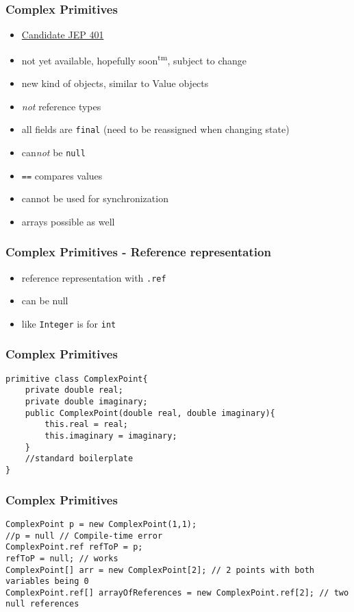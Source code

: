 \documentclass{beamer}
\begin{document}
\begin{frame}
\frametitle{Complex Primitives}
\begin{itemize}
  \item \href{https://openjdk.org/jeps/401}{Candidate JEP 401}
  \item not yet available, hopefully soon\textsuperscript{tm}, subject to change
  \pause
  \item new kind of objects, similar to Value objects
  \item \emph{not} reference types
  \item all fields are \texttt{final} (need to be reassigned when changing state)
  \item can\emph{not} be \texttt{null}
  \item \texttt{==} compares values
  \item cannot be used for synchronization
  \item arrays possible as well
\end{itemize}
\end{frame}
\begin{frame}
\frametitle{Complex Primitives - Reference representation}
\begin{itemize}
  \item reference representation with \texttt{.ref}
  \item can be null
  \item like \texttt{Integer} is for \texttt{int}
\end{itemize}
\end{frame}
\begin{frame}[fragile]
\frametitle{Complex Primitives}
\begin{lstlisting}
primitive class ComplexPoint{
	private double real;
	private double imaginary;
	public ComplexPoint(double real, double imaginary){
		this.real = real;
		this.imaginary = imaginary;
	}
	//standard boilerplate
}
\end{lstlisting}
\end{frame}

\begin{frame}[fragile]
\frametitle{Complex Primitives}
\begin{lstlisting}
ComplexPoint p = new ComplexPoint(1,1);
//p = null // Compile-time error
ComplexPoint.ref refToP = p;
refToP = null; // works
ComplexPoint[] arr = new ComplexPoint[2]; // 2 points with both variables being 0
ComplexPoint.ref[] arrayOfReferences = new ComplexPoint.ref[2]; // two null references
\end{lstlisting}
\end{frame}
\end{document}
